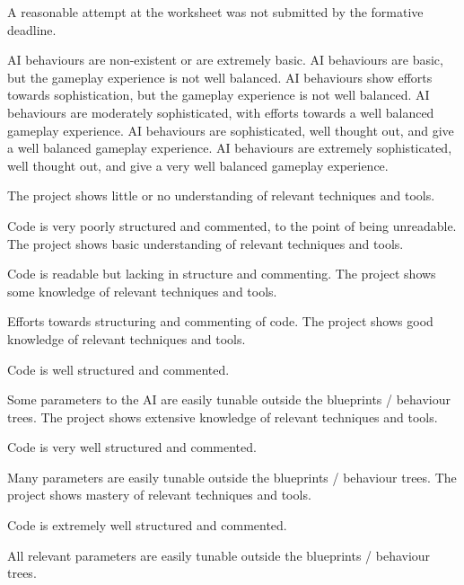 \documentclass{../../fal_assignment}
\begin{document}
\begin{markingrubric}
		\grade\fail	A reasonable attempt at the worksheet was not submitted by the formative deadline.
		
        \grade\fail AI behaviours are non-existent or are extremely basic.
		\grade AI behaviours are basic, but the gameplay experience is not well balanced.
		\grade AI behaviours show efforts towards sophistication, but the gameplay experience is not well balanced.
		\grade AI behaviours are moderately sophisticated, with efforts towards a well balanced gameplay experience.
		\grade AI behaviours are sophisticated, well thought out, and give a well balanced gameplay experience.
		\grade AI behaviours are extremely sophisticated, well thought out, and give a very well balanced gameplay experience.

        \grade \fail The project shows little or no understanding of relevant techniques and tools.
			\par Code is very poorly structured and commented, to the point of being unreadable.
        \grade The project shows basic understanding of relevant techniques and tools.
			\par Code is readable but lacking in structure and commenting.
        \grade The project shows some knowledge of relevant techniques and tools.
			\par Efforts towards structuring and commenting of code.
        \grade The project shows good knowledge of relevant techniques and tools.
			\par Code is well structured and commented.
			\par Some parameters to the AI are easily tunable outside the blueprints / behaviour trees.
        \grade The project shows extensive knowledge of relevant techniques and tools.
			\par Code is very well structured and commented.
			\par Many parameters are easily tunable outside the blueprints / behaviour trees.
        \grade The project shows mastery of relevant techniques and tools.
			\par Code is extremely well structured and commented.
			\par All relevant parameters are easily tunable outside the blueprints / behaviour trees.
\end{markingrubric}
\end{document}
